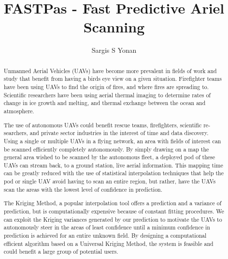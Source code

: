 \documentclass[11pt]{ucthesis}
\begin{document}

\title{FASTPas - Fast Predictive Ariel Scanning}
\author{Sargis S Yonan}
\deanlinethree{}

\begin{frontmatter}

\maketitle
\copyrightpage

\tableofcontents
\listoffigures
\listoftables

\begin{abstract}
Unmanned Aerial Vehicles (UAVs) have become more prevalent in fields of work and study that benefit from having a birds eye view on a given situation. Firefighter teams have been using UAVs to find the origin of fires, and where fires are spreading to. Scientific researchers have been using aerial thermal imaging to determine rates of change in ice growth and melting, and thermal exchange between the ocean and atmosphere.
\par
The use of autonomous UAVs could benefit rescue teams, firefighters, scientific re- searchers, and private sector industries in the interest of time and data discovery. Using a single or multiple UAVs in a flying network, an area with fields of interest can be scanned efficiently completely autonomously. By simply drawing on a map the general area wished to be scanned by the autonomous fleet, a deployed pod of these UAVs can stream back, to a ground station, live aerial information. This mapping time can be greatly reduced with the use of statistical interpolation techniques that help the pod or single UAV avoid having to scan an entire region, but rather, have the UAVs scan the areas with the lowest level of confidence in prediction.
\par
The Kriging Method, a popular interpolation tool offers a prediction and a variance of prediction, but is computationally expensive because of constant fitting procedures. We can exploit the Kriging variances generated by our prediction to motivate the UAVs to autonomously steer in the areas of least confidence until a minimum confidence in prediction is achieved for an entire unknown field. By designing a computational efficient algorithm based on a Universal Kriging Method, the system is feasible and could benefit a large group of potential users.
\end{abstract}


\end{frontmatter}
\end{document}
